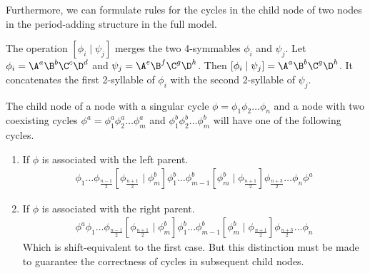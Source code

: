 Furthermore, we can formulate rules for the cycles in the child node of two nodes in the period-adding structure in the full model.

\begin{definition}
	The operation $\left[\phi_i \mid \psi_j\right]$ merges the two 4-symmables $\phi_i$ and $\psi_j$.
	Let $\phi_i = \A^a\B^b\C^c\D^d$ and $\psi_j = \A^e\B^f\C^g\D^h$.
	Then $\left[\phi_i \mid \psi_j\right] = \A^a\B^b\C^g\D^h$.
	It concatenates the first 2-syllable of $\phi_i$ with the second 2-syllable of $\psi_j$.
\end{definition}

\begin{theorem}
	The child node of a node with a singular cycle $\phi = \phi_1\phi_2 \dots \phi_n$ and a node with two coexisting cycles $\phi^a = \phi^a_1\phi^a_2 \dots \phi^a_m$ and $\phi^b_1\phi^b_2 \dots \phi^b_m$ will have one of the following cycles.
	\begin{enumerate}
		\item If $\phi$ is associated with the left parent.
		      \begin{align*}
			      \phi_1 \dots \phi_{\frac{n-1}{2}} \left[\phi_{\frac{n+1}{2}} \mid \phi^b_m\right]
			      \phi^b_1 \dots \phi^b_{m-1} \left[\phi^b_m \mid \phi_{\frac{n+1}{2}}\right]
			      \phi_{\frac{n+3}{2}} \dots \phi_n \phi^a
		      \end{align*}
		\item If $\phi$ is associated with the right parent.
		      \begin{align*}
			      \phi^a \phi_1 \dots \phi_{\frac{n-1}{2}} \left[\phi_{\frac{n+1}{2}} \mid \phi^b_m\right]
			      \phi^b_1 \dots \phi^b_{m-1} \left[\phi^b_m \mid \phi_{\frac{n+1}{2}}\right]
			      \phi_{\frac{n+3}{2}} \dots \phi_n
		      \end{align*}
		      Which is shift-equivalent to the first case.
		      But this distinction must be made to guarantee the correctness of cycles in subsequent child nodes.
	\end{enumerate}
\end{theorem}

